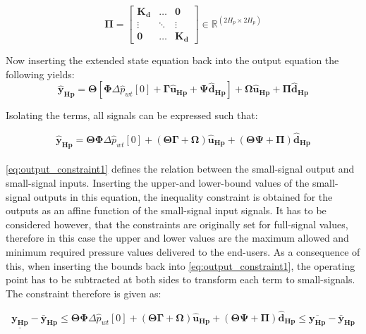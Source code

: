  \begin{equation}
 \bm{\Pi} =
 \begin{bmatrix}
 \bm{K_d} & \hdots & \bm{0} \\
 \vdots & \ddots & \vdots\\
 \bm{0} & \hdots & \bm{K_d} 
 \end{bmatrix}
 \in \pmb{\mathbb{R}}^{(2 H_p \times 2 H_p)}
 \end{equation}


Now inserting the extended state equation back into the output equation the following yields: 
\begin{equation}
	\bm{\hat{y}_{Hp}} = \bm{\Theta} [\bm{\Phi} \Delta \hat{p}_{wt}[0] + \bm{\Gamma} \bm{\hat{u}_{Hp}} + \bm{\Psi} \bm{\hat{d}_{Hp}}] + \bm{\Omega} \bm{\hat{u}_{Hp}} + \bm{\Pi} \bm{\hat{d}_{Hp}}
\end{equation}

Isolating the terms, all signals can be expressed such that: 

\begin{equation}
	\bm{\hat{y}_{Hp}} = \bm{\Theta} \bm{\Phi} \Delta \hat{p}_{wt}[0] +  (\bm{\Theta} \bm{\Gamma}+ \bm{\Omega}) \bm{\hat{u}_{Hp}} + (\bm{\Theta} \bm{\Psi} + \bm{\Pi})  \bm{\hat{d}_{Hp}}
	\label{eq:output_constraint1}
\end{equation}
\\
\eqref{eq:output_constraint1} defines the relation between the small-signal output and small-signal inputs. Inserting the upper-and lower-bound values of the small-signal outputs in this equation, the inequality constraint is obtained for the outputs as an affine function of the small-signal input signals. It has to be considered however, that the constraints are originally set for full-signal values, therefore in this case the upper and lower values are the maximum allowed and minimum required pressure values delivered to the end-users. As a consequence of this, when inserting the bounds back into \eqref{eq:output_constraint1}, the operating point has to be subtracted at both sides to transform each term to small-signals. The constraint therefore is given as: 

\begin{equation}
	\underline{\bm{y_{Hp}}} - \bm{\bar{y}_{Hp}} \leq \bm{\Theta} \bm{\Phi} \Delta \hat{p}_{wt}[0] +  (\bm{\Theta} \bm{\Gamma}+ \bm{\Omega}) \bm{\hat{u}_{Hp}} + (\bm{\Theta} \bm{\Psi} + \bm{\Pi})  \bm{\hat{d}_{Hp}} \leq \overline{\bm{y_{Hp}}} - \bm{\bar{y}_{Hp}}
	\label{eq:output_constraint2}
\end{equation}

